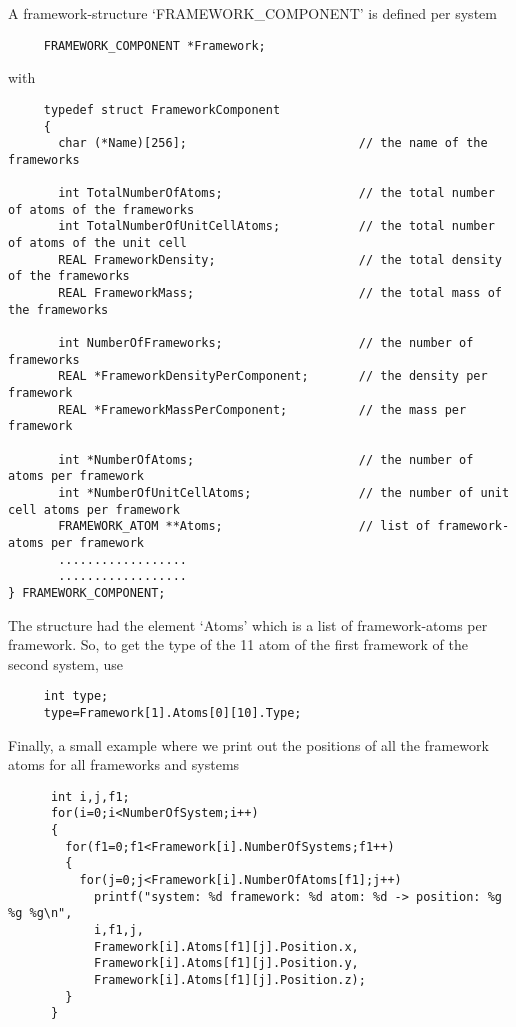 \noindent
A framework-structure `FRAMEWORK\_COMPONENT' is defined per system
\begin{verbatim}
     FRAMEWORK_COMPONENT *Framework;
\end{verbatim}
with
\begin{footnotesize}
\begin{verbatim}
     typedef struct FrameworkComponent
     {
       char (*Name)[256];                        // the name of the frameworks

       int TotalNumberOfAtoms;                   // the total number of atoms of the frameworks
       int TotalNumberOfUnitCellAtoms;           // the total number of atoms of the unit cell
       REAL FrameworkDensity;                    // the total density of the frameworks
       REAL FrameworkMass;                       // the total mass of the frameworks

       int NumberOfFrameworks;                   // the number of frameworks
       REAL *FrameworkDensityPerComponent;       // the density per framework
       REAL *FrameworkMassPerComponent;          // the mass per framework

       int *NumberOfAtoms;                       // the number of atoms per framework
       int *NumberOfUnitCellAtoms;               // the number of unit cell atoms per framework
       FRAMEWORK_ATOM **Atoms;                   // list of framework-atoms per framework
       ..................
       ..................
} FRAMEWORK_COMPONENT;
\end{verbatim}
\end{footnotesize}
The structure had the element `Atoms' which is a list of framework-atoms per framework.
So, to get the type of the 11 atom of the first framework of the second system, use
\begin{verbatim}
     int type;
     type=Framework[1].Atoms[0][10].Type;
\end{verbatim}

\noindent
Finally, a small example where we print out the positions of all the framework atoms for all frameworks and systems
\begin{verbatim}
      int i,j,f1;
      for(i=0;i<NumberOfSystem;i++)
      {
        for(f1=0;f1<Framework[i].NumberOfSystems;f1++)
        {
          for(j=0;j<Framework[i].NumberOfAtoms[f1];j++)
            printf("system: %d framework: %d atom: %d -> position: %g %g %g\n",
            i,f1,j,
            Framework[i].Atoms[f1][j].Position.x,
            Framework[i].Atoms[f1][j].Position.y,
            Framework[i].Atoms[f1][j].Position.z);
        }
      }
\end{verbatim}


